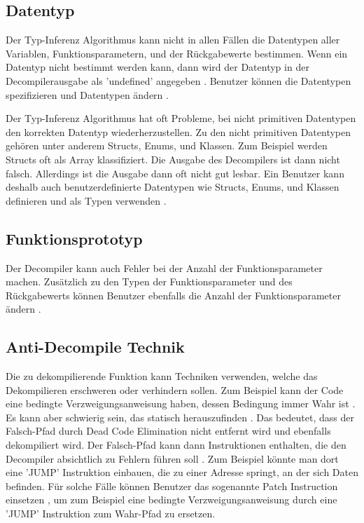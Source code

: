 \subsection{Datentyp}

Der Typ-Inferenz Algorithmus kann nicht in allen Fällen die Datentypen aller Variablen, Funktionsparametern, und der Rückgabewerte bestimmen. Wenn ein Datentyp nicht bestimmt werden kann, dann wird der Datentyp in der Decompilerausgabe als 'undefined' angegeben \cite{1}. Benutzer können die Datentypen spezifizieren und Datentypen ändern \cite{1}. 

Der Typ-Inferenz Algorithmus hat oft Probleme, bei nicht primitiven Datentypen den korrekten Datentyp wiederherzustellen. Zu den nicht primitiven Datentypen gehören unter anderem Structs, Enums, und Klassen. Zum Beispiel werden Structs oft als Array klassifiziert. Die Ausgabe des Decompilers ist dann nicht falsch. Allerdings ist die Ausgabe dann oft nicht gut lesbar. Ein Benutzer kann deshalb auch benutzerdefinierte Datentypen wie Structs, Enums, und Klassen definieren und als Typen verwenden \cite{15}.


\subsection{Funktionsprototyp}

Der Decompiler kann auch Fehler bei der Anzahl der Funktionsparameter machen. Zusätzlich zu den Typen der Funktionsparameter und des Rückgabewerts können Benutzer ebenfalls die Anzahl der Funktionsparameter ändern \cite{1}. %

\subsection{Anti-Decompile Technik}

Die zu dekompilierende Funktion kann Techniken verwenden, welche das Dekompilieren erschweren oder verhindern sollen. Zum Beispiel kann der Code eine bedingte Verzweigungsanweisung haben, dessen Bedingung immer Wahr ist \cite{15}. Es kann aber schwierig sein, das statisch herauszufinden \cite{15}. Das bedeutet, dass der Falsch-Pfad durch Dead Code Elimination nicht entfernt wird und ebenfalls dekompiliert wird. Der Falsch-Pfad kann dann Instruktionen enthalten, die den Decompiler absichtlich zu Fehlern führen soll \cite{15}. Zum Beispiel könnte man dort eine 'JUMP' Instruktion einbauen, die zu einer Adresse springt, an der sich Daten befinden. Für solche Fälle können Benutzer das sogenannte Patch Instruction einsetzen \cite{15}, um zum Beispiel eine bedingte Verzweigungsanweisung durch eine 'JUMP' Instruktion zum Wahr-Pfad zu ersetzen. 

